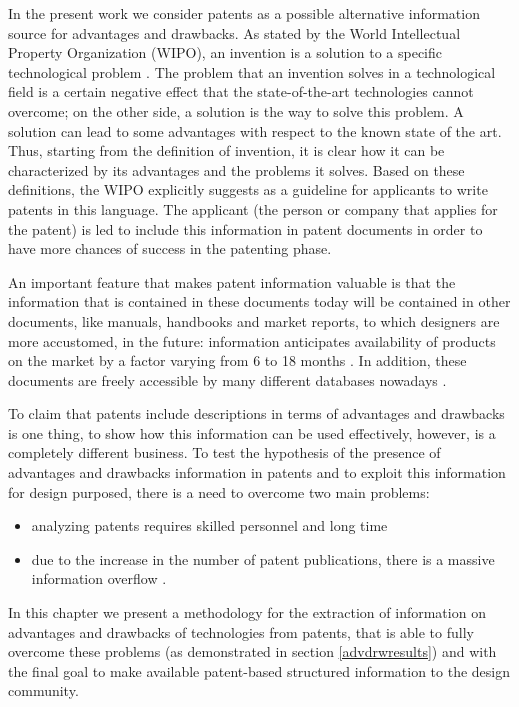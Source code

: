 \documentclass[]{book}
\providecommand{\tightlist}{%
  \setlength{\itemsep}{0pt}\setlength{\parskip}{0pt}}
\begin{document}
In the present work we consider patents as a possible alternative
information source for advantages and drawbacks. As stated by the World
Intellectual Property Organization (WIPO), an invention is a solution to
a specific technological problem \citep{world2004wipo}. The problem that
an invention solves in a technological field is a certain negative
effect that the state-of-the-art technologies cannot overcome; on the
other side, a solution is the way to solve this problem. A solution can
lead to some advantages with respect to the known state of the art.
Thus, starting from the definition of invention, it is clear how it can
be characterized by its advantages and the problems it solves. Based on
these definitions, the WIPO explicitly suggests as a guideline for
applicants to write patents in this language. The applicant (the person
or company that applies for the patent) is led to include this
information in patent documents in order to have more chances of success
in the patenting phase.

An important feature that makes patent information valuable is that the
information that is contained in these documents today will be contained
in other documents, like manuals, handbooks and market reports, to which
designers are more accustomed, in the future: information anticipates
availability of products on the market by a factor varying from 6 to 18
months \citep{golzio2012}. In addition, these documents are freely
accessible by many different databases nowadays \citep{kim2015patent}.

To claim that patents include descriptions in terms of advantages and
drawbacks is one thing, to show how this information can be used
effectively, however, is a completely different business. To test the
hypothesis of the presence of advantages and drawbacks information in
patents and to exploit this information for design purposed, there is a
need to overcome two main problems:

\begin{itemize}
\tightlist
\item
  analyzing patents requires skilled personnel and long time
  \citep{leon2007trends}
\item
  due to the increase in the number of patent publications, there is a
  massive information overflow \citep{bergmann2008evaluating}.
\end{itemize}

In this chapter we present a methodology for the extraction of
information on advantages and drawbacks of technologies from patents,
that is able to fully overcome these problems (as demonstrated in
section \ref{advdrwresults}) and with the final goal to make available
patent-based structured information to the design community.
\end{document}
